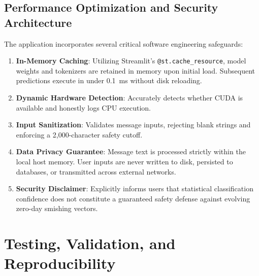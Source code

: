 \documentclass[conference]{IEEEtran}
\begin{document}
\subsection{Performance Optimization and Security Architecture}
The application incorporates several critical software engineering safeguards:
\begin{enumerate}
    \item \textbf{In-Memory Caching}: Utilizing Streamlit's \texttt{@st.cache\_resource}, model weights and tokenizers are retained in memory upon initial load. Subsequent predictions execute in under 0.1~ms without disk reloading.
    \item \textbf{Dynamic Hardware Detection}: Accurately detects whether CUDA is available and honestly logs CPU execution.
    \item \textbf{Input Sanitization}: Validates message inputs, rejecting blank strings and enforcing a 2,000-character safety cutoff.
    \item \textbf{Data Privacy Guarantee}: Message text is processed strictly within the local host memory. User inputs are never written to disk, persisted to databases, or transmitted across external networks.
    \item \textbf{Security Disclaimer}: Explicitly informs users that statistical classification confidence does not constitute a guaranteed safety defense against evolving zero-day smishing vectors.
\end{enumerate}

\section{Testing, Validation, and Reproducibility}
\label{sec:validation}
\end{document}
